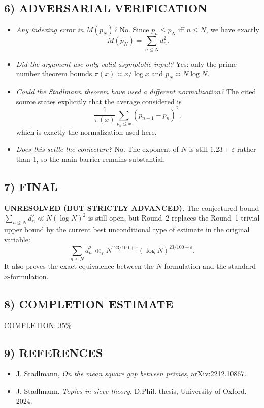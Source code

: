 \subsection*{6) ADVERSARIAL VERIFICATION}
\begin{itemize}
\item \emph{Any indexing error in $M(p_N)$?} No.  Since $p_n\le p_N$ iff $n\le N$, we have exactly
\[
M(p_N)=\sum_{n\le N} d_n^2.
\]
\item \emph{Did the argument use only valid asymptotic input?} Yes: only the prime number theorem bounds $\pi(x)\asymp x/\log x$ and $p_N\asymp N\log N$.
\item \emph{Could the Stadlmann theorem have used a different normalization?} The cited source states explicitly that the average considered is
\[
\frac{1}{\pi(x)}\sum_{p_n\le x}(p_{n+1}-p_n)^2,
\]
which is exactly the normalization used here.
\item \emph{Does this settle the conjecture?} No.  The exponent of $N$ is still $1.23+\varepsilon$ rather than $1$, so the main barrier remains substantial.
\end{itemize}

\subsection*{7) FINAL}
\textbf{UNRESOLVED (BUT STRICTLY ADVANCED).}  The conjectured bound $\sum_{n\le N} d_n^2\ll N(\log N)^2$ is still open, but Round~2 replaces the Round~1 trivial upper bound by the current best unconditional type of estimate in the original variable:
\[
\sum_{n\le N} d_n^2 \ll_{\varepsilon} N^{123/100+\varepsilon}(\log N)^{23/100+\varepsilon}.
\]
It also proves the exact equivalence between the $N$-formulation and the standard $x$-formulation.

\subsection*{8) COMPLETION ESTIMATE}
COMPLETION: 35\%

\subsection*{9) REFERENCES}
\begin{itemize}
\item J. Stadlmann, \emph{On the mean square gap between primes}, arXiv:2212.10867.
\item J. Stadlmann, \emph{Topics in sieve theory}, D.Phil. thesis, University of Oxford, 2024.
\end{itemize}
